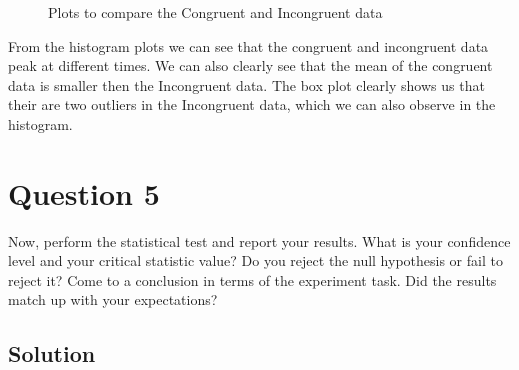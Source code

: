 \documentclass[12pt]{article}%
\begin{document}
 \begin{figure}[h]
     \centering
     \qquad
     \caption{Plots to compare the Congruent and Incongruent data}%
     \label{fig:example}%
 \end{figure}
 
From the histogram plots we can see that the congruent and incongruent data peak at different times. We can also clearly see that the mean of the congruent data is smaller then the Incongruent data. The box plot clearly shows us that their are two outliers in the Incongruent data, which we can also observe in the histogram.  
 
\newpage
\section*{Question 5}
Now, perform the statistical test and report your results. What is your confidence level and your critical statistic value? Do you reject the null hypothesis or fail to reject it? Come to a conclusion in terms of the experiment task. Did the results match up with your expectations?

\subsection*{Solution}
\end{document}
